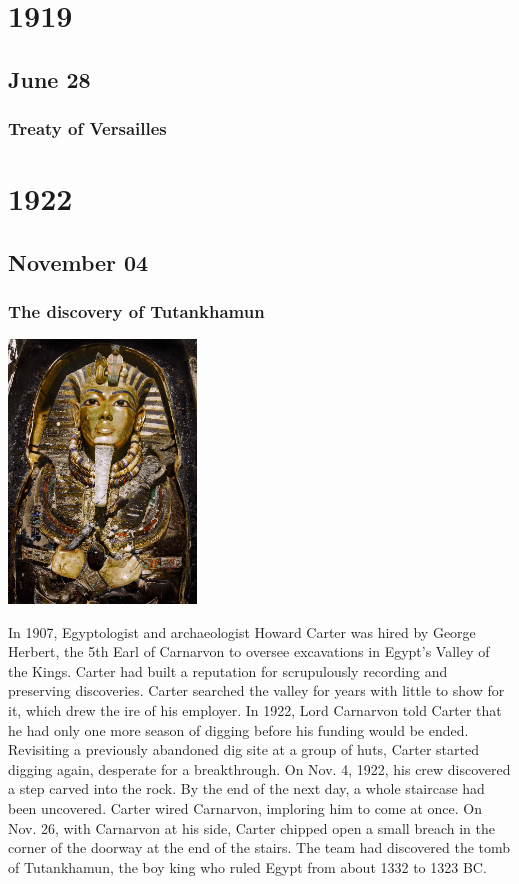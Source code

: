 \documentclass[11pt]{report}
\begin{document}
\chapter{1919}
\section{June 28}
\subsection{Treaty of Versailles}

\chapter{1922}
\section{November 04}
\subsection{The discovery of Tutankhamun}
\vspace{2mm}\begin{center}\includegraphics[width=5cm]{./img/tutankhamon.jpg}\end{center}
In 1907, Egyptologist and archaeologist Howard Carter was hired by George Herbert, the 5th Earl of Carnarvon to oversee excavations in Egypt’s Valley of the Kings. Carter had built a reputation for scrupulously recording and preserving discoveries.
Carter searched the valley for years with little to show for it, which drew the ire of his employer. In 1922, Lord Carnarvon told Carter that he had only one more season of digging before his funding would be ended.
Revisiting a previously abandoned dig site at a group of huts, Carter started digging again, desperate for a breakthrough.
On Nov. 4, 1922, his crew discovered a step carved into the rock. By the end of the next day, a whole staircase had been uncovered. Carter wired Carnarvon, imploring him to come at once.
On Nov. 26, with Carnarvon at his side, Carter chipped open a small breach in the corner of the doorway at the end of the stairs.
The team had discovered the tomb of Tutankhamun, the boy king who ruled Egypt from about 1332 to 1323 BC.
\end{document}
